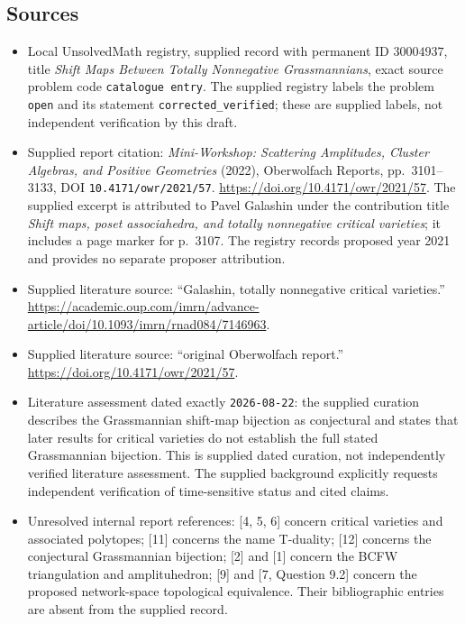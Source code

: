 \documentclass[11pt]{article}
\begin{document}
\subsection{Sources}
\begin{itemize}
\item Local UnsolvedMath registry, supplied record with permanent ID \(30004937\), title \emph{Shift Maps Between Totally Nonnegative Grassmannians}, exact source problem code \texttt{catalogue entry}. The supplied registry labels the problem \texttt{open} and its statement \texttt{corrected\_verified}; these are supplied labels, not independent verification by this draft.
\item Supplied report citation: \emph{Mini-Workshop: Scattering Amplitudes, Cluster Algebras, and Positive Geometries} (2022), Oberwolfach Reports, pp.\ 3101--3133, DOI \texttt{10.4171/owr/2021/57}. \url{https://doi.org/10.4171/owr/2021/57}. The supplied excerpt is attributed to Pavel Galashin under the contribution title \emph{Shift maps, poset associahedra, and totally nonnegative critical varieties}; it includes a page marker for p.\ 3107. The registry records proposed year 2021 and provides no separate proposer attribution.
\item Supplied literature source: ``Galashin, totally nonnegative critical varieties.'' \url{https://academic.oup.com/imrn/advance-article/doi/10.1093/imrn/rnad084/7146963}.
\item Supplied literature source: ``original Oberwolfach report.'' \url{https://doi.org/10.4171/owr/2021/57}.
\item Literature assessment dated exactly \texttt{2026-08-22}: the supplied curation describes the Grassmannian shift-map bijection as conjectural and states that later results for critical varieties do not establish the full stated Grassmannian bijection. This is supplied dated curation, not independently verified literature assessment. The supplied background explicitly requests independent verification of time-sensitive status and cited claims.
\item Unresolved internal report references: [4, 5, 6] concern critical varieties and associated polytopes; [11] concerns the name T-duality; [12] concerns the conjectural Grassmannian bijection; [2] and [1] concern the BCFW triangulation and amplituhedron; [9] and [7, Question 9.2] concern the proposed network-space topological equivalence. Their bibliographic entries are absent from the supplied record.
\end{itemize}
\end{document}

